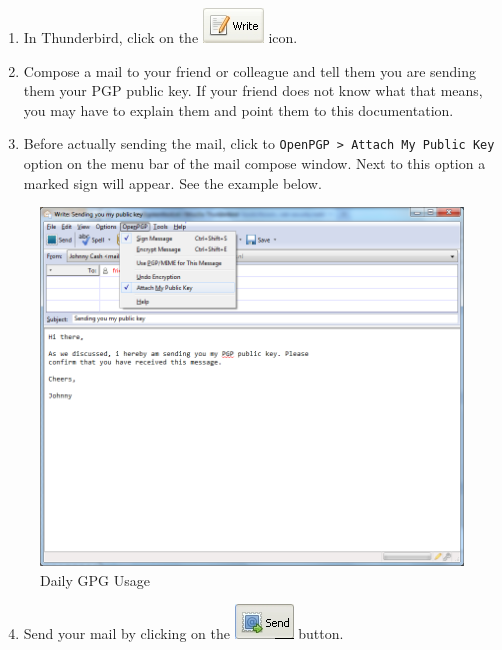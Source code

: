 \begin{enumerate}[1.]
\item
  In Thunderbird, click on the \includegraphics{gpg_write.png} icon.
\item
  Compose a mail to your friend or colleague and tell them you are
  sending them your PGP public key. If your friend does not know what
  that means, you may have to explain them and point them to this
  documentation.
\item
  Before actually sending the mail, click to
  \verb!OpenPGP > Attach My Public Key! option on the menu bar of the
  mail compose window. Next to this option a marked sign will appear.
  See the example below.
\end{enumerate}
\begin{figure}[htbp]
\centering
\includegraphics{daily_gpg_3.png}
\caption{Daily GPG Usage}
\end{figure}

\begin{enumerate}[1.]
\setcounter{enumi}{3}
\item
  Send your mail by clicking on the \includegraphics{gpg_send.png}
  button.
\end{enumerate}
